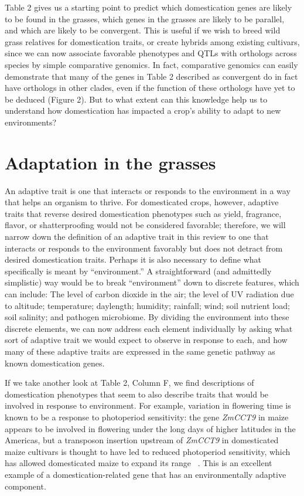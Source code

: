 \documentclass[12pt]{article}
\begin{document}
Table 2 gives us a starting point to predict which domestication genes are likely to be found in the grasses, which genes in the grasses are likely to be parallel, and which are likely to be convergent. This is useful if we wish to breed wild grass relatives for domestication traits, or create hybrids among existing cultivars, since we can now associate favorable phenotypes and QTLs with orthologs across species by simple comparative genomics. In fact, comparative genomics can easily demonstrate that many of the genes in Table 2 described as convergent do in fact have orthologs in other clades, even if the function of these orthologs have yet to be deduced (Figure 2).  But to what extent can this knowledge help us to understand how domestication has impacted a crop’s ability to adapt to new environments?
\paragraph{}

\section*{Adaptation in the grasses}
An adaptive trait is one that interacts or responds to the environment in a way that helps an organism to thrive. For domesticated crops, however, adaptive traits that reverse desired domestication phenotypes such as yield, fragrance, flavor, or shatterproofing would not be considered favorable; therefore, we will narrow down the definition of an adaptive trait in this review to one that interacts or responds to the environment favorably but does not detract from desired domestication traits.  Perhaps it is also necessary to define what specifically is meant by “environment.” A straightforward (and admittedly simplistic) way would be to break “environment” down to discrete features, which can include: The level of carbon dioxide in the air; the level of UV radiation due to altitude; temperature; daylength; humidity; rainfall; wind; soil nutrient load; soil salinity; and pathogen microbiome.  By dividing the environment into these discrete elements, we can now address each element individually by asking what sort of adaptive trait we would expect to observe in response to each, and how many of these adaptive traits are expressed in the same genetic pathway as known domestication genes. 

If we take another look at Table 2, Column F, we find descriptions of domestication phenotypes that seem to also describe traits that would be involved in response to environment. For example, variation in flowering time is known to be a response to photoperiod sensitivity: the gene \textit{ZmCCT9} in maize appears to be involved in flowering under the long days of higher latitudes in the Americas, but a transposon insertion upstream of \textit{ZmCCT9} in domesticated maize cultivars is thought to have led to reduced photoperiod sensitivity, which has allowed domesticated maize to expand its range ~\cite{Huang2017}.  This is an excellent example of a domestication-related gene that has an environmentally adaptive component. 
\end{document}
